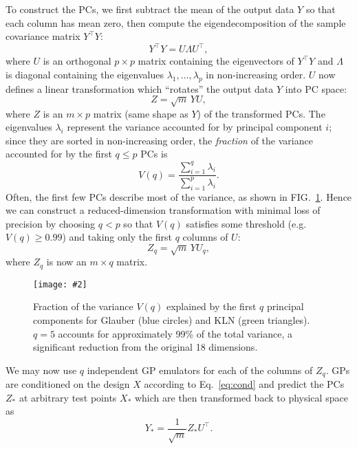 \documentclass[aps,prc,reprint,amsmath]{revtex4-1}
\newcommand{\colfig}[3][t]{
  \begin{figure}[#1]
    \texttt{[image: \#2]}
    \caption{\label{fig:#2}#3}
  \end{figure}
}
\newcommand{\tran}{^\intercal}
\begin{document}
To construct the PCs, we first subtract the mean of the output data $Y$ so that each column has mean zero, then compute the eigendecomposition of the sample covariance matrix $Y\tran Y$:
\begin{equation}
  Y\tran Y = U \Lambda U\tran,
  \label{eq:cov}
\end{equation}
where $U$ is an orthogonal $p \times p$ matrix containing the eigenvectors of $Y\tran Y$ and $\Lambda$ is diagonal containing the eigenvalues $\lambda_1, \ldots, \lambda_p$ in non-increasing order.
$U$ now defines a linear transformation which ``rotates'' the output data $Y$ into PC space:
\begin{equation}
  Z = \sqrt m \, YU,
\end{equation}
where $Z$ is an $m \times p$ matrix (same shape as $Y$) of the transformed PCs.
The eigenvalues $\lambda_i$ represent the variance accounted for by principal component $i$; since they are sorted in non-increasing order, the \emph{fraction} of the variance accounted for by the first $q \leq p$ PCs is
\begin{equation}
  V(q) = \frac{\sum_{i=1}^q \lambda_i}{\sum_{i=1}^p \lambda_i}.
\end{equation}
Often, the first few PCs describe most of the variance, as shown in FIG.~\ref{fig:pc_var}.
Hence we can construct a reduced-dimension transformation with minimal loss of precision by choosing $q < p$ so that $V(q)$ satisfies some threshold (e.g.~$V(q) \geq 0.99$) and taking only the first $q$ columns of $U$:
\begin{equation}
  Z_q = \sqrt m \, YU_q,
\end{equation}
where $Z_q$ is now an $m \times q$ matrix.

\colfig{pc_var}{
  Fraction of the variance $V(q)$ explained by the first $q$ principal components for Glauber (blue circles) and KLN (green triangles).
  $q = 5$ accounts for approximately 99\% of the total variance, a significant reduction from the original 18 dimensions.
}

We may now use $q$ independent GP emulators for each of the columns of $Z_q$.
GPs are conditioned on the design $X$ according to Eq.~\eqref{eq:cond} and predict the PCs $Z_*$ at arbitrary test points $X_*$ which are then transformed back to physical space as
\begin{equation}
  Y_* = \frac{1}{\sqrt m} Z_* U\tran.
\end{equation}
\end{document}
